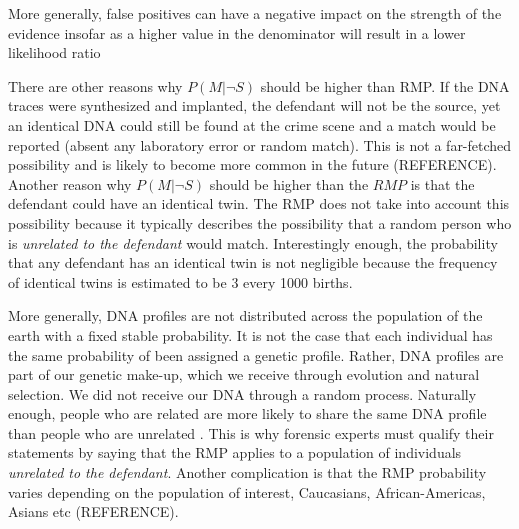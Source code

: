 \documentclass[10pt]{article}
\begin{document}
More generally, false positives 
can have a negative impact on the strength of the evidence insofar as a higher 
value in the denominator will result in a lower likelihood ratio 

There are other reasons why $P(M| \neg S)$  should be higher than RMP. 
If the DNA traces were synthesized and implanted, the defendant will not be the source, yet 
an identical DNA could still be found at the crime scene and a match would be reported (absent any laboratory error or random match). 
This is not a far-fetched possibility and is likely to become more common in the future (REFERENCE).
Another reason why $P(M | \neg S)$ should be higher than the $RMP$ is that the defendant 
could have an identical twin. The RMP  does not take into account this possibility because it typically 
describes the possibility that a random person who is \textit{unrelated to the defendant} 
would match. Interestingly enough, the probability that any defendant has an identical twin 
is not negligible because the frequency of identical twins is estimated to be 3 every 1000 births. 

More generally, DNA profiles are not distributed across the population of the earth with a fixed stable probability. It is not the case that each individual has the same probability of been assigned a genetic profile. Rather, DNA profiles are part of our genetic make-up, which we receive through evolution and natural selection. We did not receive our DNA through a random process. Naturally enough, people who are related are more likely to share the same DNA profile than people who are unrelated \citep{Buckleton2005Population, Weir2007rarity}. This is why forensic experts must qualify their statements by saying that the RMP applies to a population of individuals \textit{unrelated to the defendant}. Another complication is that the RMP probability varies depending on the population of interest, 
Caucasians, African-Americas, Asians etc (REFERENCE). 
\end{document}
